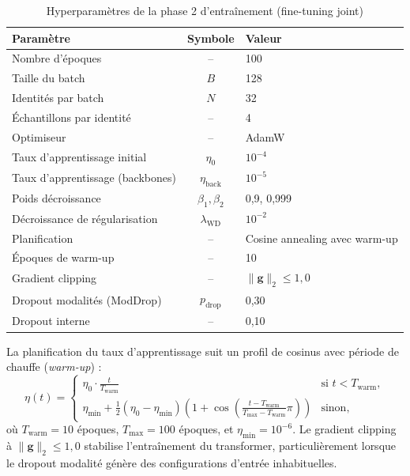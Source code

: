 \documentclass[12pt,a4paper]{report}
\begin{document}
\begin{table}[htbp]
\centering
\caption{Hyperparam\`{e}tres de la phase 2 d'entra\^{i}nement (fine-tuning joint)}
\label{tab:hyperparams-training}
\begin{tabular}{lcl}
\hline
\hline
Param\`{e}tre & Symbole & Valeur \\
\hline
Nombre d'\'{e}poques & -- & 100 \\
Taille du batch & $B$ & 128 \\
Identit\'{e}s par batch & $N$ & 32 \\
\'{E}chantillons par identit\'{e} & -- & 4 \\
Optimiseur & -- & AdamW \cite{loshchilov2018adamw} \\
Taux d'apprentissage initial & $\eta_0$ & $10^{-4}$ \\
Taux d'apprentissage (backbones) & $\eta_{\text{back}}$ & $10^{-5}$ \\
Poids d\'{e}croissance & $\beta_1, \beta_2$ & 0{,}9, 0{,}999 \\
D\'{e}croissance de r\'{e}gularisation & $\lambda_{\text{WD}}$ & $10^{-2}$ \\
Planification & -- & Cosine annealing avec warm-up \\
\'{E}poques de warm-up & -- & 10 \\
Gradient clipping & -- & $\|\mathbf{g}\|_2 \leq 1{,}0$ \\
Dropout modalit\'{e}s (ModDrop) & $p_{\text{drop}}$ & 0{,}30 \\
Dropout interne & -- & 0{,}10 \\
\hline
\hline
\end{tabular}
\end{table}

La planification du taux d'apprentissage suit un profil de cosinus avec p\'{e}riode de chauffe (\emph{warm-up}) :
\begin{equation}
\label{eq:cosine-schedule}
\eta(t) = \begin{cases}
\eta_0 \cdot \frac{t}{T_{\text{warm}}} & \text{si } t < T_{\text{warm}}, \\
\eta_{\min} + \frac{1}{2}(\eta_0 - \eta_{\min})\left(1 + \cos\left(\frac{t - T_{\text{warm}}}{T_{\max} - T_{\text{warm}}} \pi\right)\right) & \text{sinon},
\end{cases}
\end{equation}
o\`{u} $T_{\text{warm}} = 10$ \'{e}poques, $T_{\max} = 100$ \'{e}poques, et $\eta_{\min} = 10^{-6}$. Le gradient clipping \`{a} $\|\mathbf{g}\|_2 \leq 1{,}0$ stabilise l'entra\^{i}nement du transformer, particuli\`{e}rement lorsque le dropout modalit\'{e} g\'{e}n\`{e}re des configurations d'entr\'{e}e inhabituelles.
\end{document}
